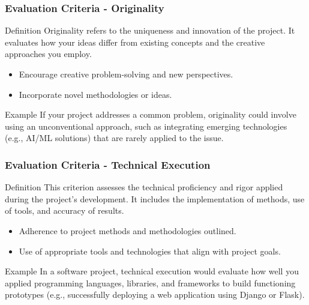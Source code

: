\documentclass[aspectratio=169]{beamer}
\begin{document}
\begin{frame}[fragile]
    \frametitle{Evaluation Criteria - Originality}
    \begin{block}{Definition}
        Originality refers to the uniqueness and innovation of the project. It evaluates how your ideas differ from existing concepts and the creative approaches you employ.
    \end{block}

    \begin{itemize}
        \item Encourage creative problem-solving and new perspectives.
        \item Incorporate novel methodologies or ideas.
    \end{itemize}

    \begin{block}{Example}
        If your project addresses a common problem, originality could involve using an unconventional approach, such as integrating emerging technologies (e.g., AI/ML solutions) that are rarely applied to the issue.
    \end{block}
\end{frame}

\begin{frame}[fragile]
    \frametitle{Evaluation Criteria - Technical Execution}
    \begin{block}{Definition}
        This criterion assesses the technical proficiency and rigor applied during the project's development. It includes the implementation of methods, use of tools, and accuracy of results.
    \end{block}

    \begin{itemize}
        \item Adherence to project methods and methodologies outlined.
        \item Use of appropriate tools and technologies that align with project goals.
    \end{itemize}

    \begin{block}{Example}
        In a software project, technical execution would evaluate how well you applied programming languages, libraries, and frameworks to build functioning prototypes (e.g., successfully deploying a web application using Django or Flask).
    \end{block}
\end{frame}
\end{document}
